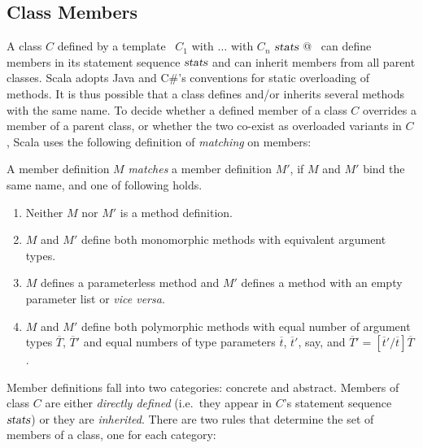 \subsection{Class Members}
\label{sec:members}

A class $C$ defined by a template 
~\lstinline@$C_1$ with $\ldots$ with $C_n$ { $\mbox{\sl stats}$ }@~ 
can define members in its statement sequence
$\mbox{\sl stats}$ and can inherit members from all parent classes.  Scala
adopts Java and C\#'s conventions for static overloading of
methods. It is thus possible that a class defines and/or inherits
several methods with the same name.  To decide whether a defined
member of a class $C$ overrides a member of a parent class, or whether
the two co-exist as overloaded variants in $C$, Scala uses the
following definition of {\em matching} on members:

\begin{definition}
A member definition $M$ {\em matches} a member definition $M'$, if $M$
and $M'$ bind the same name, and one of following holds.
\begin{enumerate}
\item Neither $M$ nor $M'$ is a method definition.
\item $M$ and $M'$ define both monomorphic methods with equivalent argument
  types.
\item $M$ defines a parameterless method and $M'$ defines a method
  with an empty parameter list \code{()} or {\em vice versa}. 
\item $M$ and $M'$ define both polymorphic methods with 
equal number of argument types $\overline T$, $\overline T'$
and equal numbers of type parameters
$\overline t$, $\overline t'$, say, and $\overline T' = [\overline t'/\overline t]\overline T$.
\end{enumerate}
\end{definition}
Member definitions fall into two categories: concrete and abstract.
Members of class $C$ are either {\em directly defined} (i.e.\ they appear in
$C$'s statement sequence $\mbox{\sl stats}$) or they are {\em inherited}.  There are two rules
that determine the set of members of a class, one for each category:

